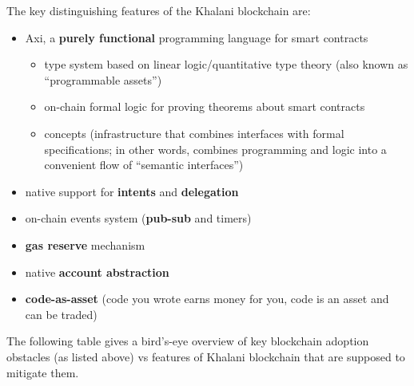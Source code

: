 \documentclass[a4paper]{article}
\begin{document}
The key distinguishing features of the Khalani blockchain are:

\begin{itemize}
  \item Axi, a \textbf{purely functional} programming language for smart contracts
  \begin{itemize}
    \item type system based on linear logic/quantitative type theory (also known as ``programmable assets'')
    \item on-chain formal logic for proving theorems about smart contracts
    \item concepts (infrastructure that combines interfaces with formal specifications; in other words, combines programming and logic into a convenient flow of ``semantic interfaces'')
  \end{itemize}
  \item native support for \textbf{intents} and \textbf{delegation}
  \item on-chain events system (\textbf{pub-sub} and timers)
  \item \textbf{gas reserve} mechanism
  \item native \textbf{account abstraction}
  \item \textbf{code-as-asset} (code you wrote earns money for you, code is an asset and can be traded)
\end{itemize}

The following table gives a bird's-eye overview of key blockchain adoption obstacles (as listed above) vs features of Khalani blockchain that are supposed to mitigate them.
\end{document}
